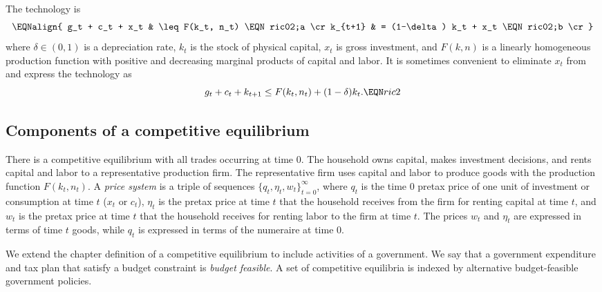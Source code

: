 The technology is
$$\EQNalign{ g_t + c_t + x_t &  \leq F(k_t, n_t) \EQN ric02;a \cr
   k_{t+1} & = (1-\delta) k_t + x_t \EQN ric02;b \cr }  $$
where $\delta \in (0,1)$ is a depreciation rate,  $k_t$ is the stock
of physical capital, $x_t$ is gross investment,
and $F(k,n)$ is a linearly homogeneous  production
function with positive and decreasing marginal products of capital and
labor.
It is sometimes convenient to eliminate $x_t$ from   and express
the technology as
$$ g_t + c_t + k_{t+1} \leq F(k_t, n_t) + (1-\delta) k_t. \EQN ric2 $$


\subsection{Components of a competitive equilibrium}
There is a competitive equilibrium with all trades occurring at
time $0$. The household owns  capital, makes investment decisions,
and rents capital and labor to a representative production firm.
The representative firm uses capital and labor to produce goods
with the production function $F(k_t, n_t)$. A {\it price system\/}
is a triple of sequences $\{q_t, \eta_t, w_t\}_{t=0}^\infty$, where
$q_t$ is the time $0$ pretax price of one unit of investment or
consumption at time $t$ ($x_t$ or $c_t$),  $\eta_t$ is the pretax
price at time $t$ that the household receives from the firm for
renting capital at time $t$, and $w_t$ is the pretax price at
time $t$ that the household receives for renting labor to the firm
at time $t$. The prices $w_t$ and $ \eta_t$ are  expressed in terms
 of
time $t$ goods, while $q_t$ is expressed in terms of the  numeraire at time $0$.






We extend the chapter  definition of  a competitive
 equilibrium   to include activities of a  government.
We say that a government expenditure and tax plan that satisfy a
budget constraint is {\it budget feasible}.   A set of competitive
equilibria is   indexed by alternative budget-feasible government
policies.

